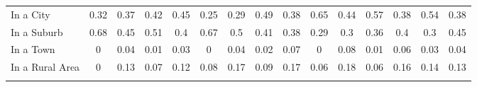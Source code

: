 \begin{tabular*}{\linewidth}{@{\extracolsep{\fill} } lcccccccccccccc}
\hspace{0.2cm}In a City&0.32&0.37&0.42&0.45&0.25&0.29&0.49&0.38&0.65&0.44&0.57&0.38&0.54&0.38\\%
\hspace{0.2cm}In a Suburb&0.68&0.45&0.51&0.4&0.67&0.5&0.41&0.38&0.29&0.3&0.36&0.4&0.3&0.45\\%
\hspace{0.2cm}In a Town&0&0.04&0.01&0.03&0&0.04&0.02&0.07&0&0.08&0.01&0.06&0.03&0.04\\%
\hspace{0.2cm}In a Rural Area&0&0.13&0.07&0.12&0.08&0.17&0.09&0.17&0.06&0.18&0.06&0.16&0.14&0.13\\%
&&&&&&&&&&&&&&\\%
\hline%
\end{tabular*}